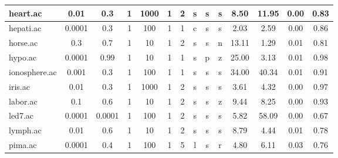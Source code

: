 \begin{table}[htbp]
\begin{tabular}{|l|c|c|c|c|c|c|c|c|c||c|c|c|c|}
		\hline
		heart.ac       & 0.01     & 0.3         & 1              & 1000                & 1             & 2             & s      & s        & s        & 8.50           & 11.95          & 0.00           & 0.83           \\
		\hline
		hepati.ac      & 0.0001   & 0.3         & 1              & 100                 & 1             & 1             & c      & s        & s        & 2.03           & 2.59           & 0.00           & 0.86           \\
		\hline
		horse.ac       & 0.3      & 0.7         & 1              & 10                  & 1             & 2             & s      & s        & n        & 13.11          & 1.29           & 0.01           & 0.81           \\
		\hline
		hypo.ac        & 0.0001   & 0.99        & 1              & 10                  & 1             & 1             & s      & p        & z        & 25.00          & 3.13           & 0.01           & 0.98           \\
		\hline
		ionosphere.ac  & 0.001    & 0.3         & 1              & 100                 & 1             & 1             & s      & s        & s        & 34.00          & 40.34          & 0.01           & 0.91           \\
		\hline
		iris.ac        & 0.01     & 0.3         & 1              & 1000                & 1             & 2             & s      & s        & s        & 3.61           & 4.32           & 0.00           & 0.97           \\
		\hline
		labor.ac       & 0.1      & 0.6         & 1              & 10                  & 1             & 2             & s      & s        & z        & 9.44           & 8.25           & 0.00           & 0.93           \\
		\hline
		led7.ac        & 0.0001   & 0.0001      & 1              & 100                 & 1             & 2             & s      & s        & s        & 5.82           & 58.09          & 0.00           & 0.67           \\
		\hline
		lymph.ac       & 0.01     & 0.6         & 1              & 10                  & 1             & 2             & s      & s        & s        & 8.79           & 4.44           & 0.01           & 0.78           \\
		\hline
		pima.ac        & 0.0001   & 0.4         & 1              & 100                 & 1             & 5             & l      & s        & r        & 4.80           & 6.11           & 0.03           & 0.76           \\

\end{tabular}
\end{table}
